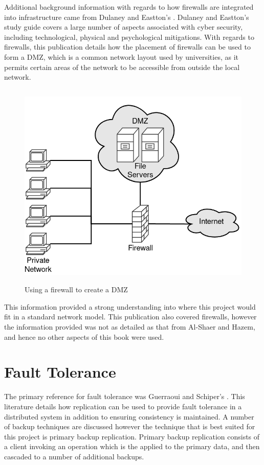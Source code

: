 \documentclass[a4paper, 11pt]{report}
\begin{document}
Additional background information with regards to how firewalls are integrated into infrastructure came from Dulaney and Eastton's  \cite{comptiaSec}. Dulaney and Eastton's study guide covers a large number of aspects associated with cyber security, including technological, physical and psychological mitigations. With regards to firewalls, this publication details how the placement of firewalls can be used to form a \acrfull{DMZ}, which is a common network layout used by universities, as it permits certain areas of the network to be accessible from outside the local network.

\begin{figure}[H]
\centering
\includegraphics[height=10cm,keepaspectratio]{DMZ}
\caption{Using a firewall to create a \acrshort{DMZ}}
\label{fig:dmz}
\end{figure}

This information provided a strong understanding into where this project would fit in a standard network model. This publication also covered firewalls, however the information provided was not as detailed as that from Al-Shaer and Hazem, and hence no other aspects of this book were used.

\section{Fault Tolerance}
The primary reference for fault tolerance was Guerraoui and Schiper's \cite{faulttol}. This literature details how replication can be used to provide fault tolerance in a distributed system in addition to ensuring consistency is maintained.  A number of backup techniques are discussed however the technique that is best suited for this project is primary backup replication. Primary backup replication consists of a client invoking an operation which is the applied to the primary data, and then cascaded to a number of additional backups.
\end{document}

